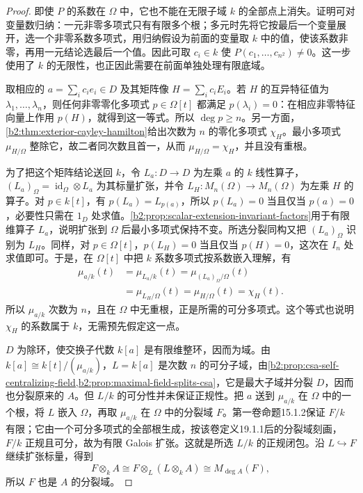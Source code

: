 \begin{proof}
	即使 \(P\) 的系数在 \(\Omega\) 中，它也不能在无限子域 \(k\) 的全部点上消失。证明可对变量数归纳：一元非零多项式只有有限多个根；多元时先将它按最后一个变量展开，选一个非零系数多项式，用归纳假设为前面的变量取 \(k\) 中的值，使该系数非零，再用一元结论选最后一个值。因此可取 \(c_i\in k\) 使 \(P(c_1,\ldots,c_{n^2})\ne0\)。这一步使用了 \(k\) 的无限性，也正因此需要在前面单独处理有限底域。

	取相应的 \(a=\sum_i c_ie_i\in D\) 及其矩阵像 \(H=\sum_i c_iE_i\)。若 \(H\) 的互异特征值为 \(\lambda_1,\ldots,\lambda_n\)，则任何非零零化多项式 \(p\in\Omega[t]\) 都满足 \(p(\lambda_i)=0\)：在相应非零特征向量上作用 \(p(H)\)，就得到这一等式。所以 \(\deg p\ge n\)。另一方面，\cref{b2:thm:exterior-cayley-hamilton}给出次数为 \(n\) 的零化多项式 \(\chi_H\)。最小多项式 \(\mu_{H/\Omega}\) 整除它，故二者同次数且首一，从而 \(\mu_{H/\Omega}=\chi_H\)，并且没有重根。

	为了把这个矩阵结论送回 \(k\)，令 \(L_a:D\rightarrow D\) 为左乘 \(a\) 的 \(k\) 线性算子，\((L_a)_\Omega=\operatorname{id}_\Omega\otimes L_a\) 为其标量扩张，并令 \(L_H:M_n(\Omega)\rightarrow M_n(\Omega)\) 为左乘 \(H\) 的算子。对 \(p\in k[t]\)，有 \(p(L_a)=L_{p(a)}\)，所以 \(p(L_a)=0\) 当且仅当 \(p(a)=0\)，必要性只需在 \(1_D\) 处求值。\cref{b2:prop:scalar-extension-invariant-factors}用于有限维算子 \(L_a\)，说明扩张到 \(\Omega\) 后最小多项式保持不变。所选分裂同构又把 \((L_a)_\Omega\) 识别为 \(L_H\)。同样，对 \(p\in\Omega[t]\)，\(p(L_H)=0\) 当且仅当 \(p(H)=0\)，这次在 \(I_n\) 处求值即可。于是，在 \(\Omega[t]\) 中把 \(k\) 系数多项式按系数嵌入理解，有
	\[
		\begin{aligned}
			\mu_{a/k}(t) &=\mu_{L_a/k}(t)=\mu_{(L_a)_\Omega/\Omega}(t)\\
			&=\mu_{L_H/\Omega}(t)=\mu_{H/\Omega}(t)=\chi_H(t).
		\end{aligned}
	\]
	所以 \(\mu_{a/k}\) 次数为 \(n\)，且在 \(\Omega\) 中无重根，正是所需的可分多项式。这个等式也说明 \(\chi_H\) 的系数属于 \(k\)，无需预先假定这一点。

	\(D\) 为除环，使交换子代数 \(k[a]\) 是有限维整环，因而为域。由 \(k[a]\cong k[t]/(\mu_{a/k})\)，\(L=k[a]\) 是次数 \(n\) 的可分子域，由\cref{b2:prop:csa-self-centralizing-field,b2:prop:maximal-field-splits-csa}，它是最大子域并分裂 \(D\)，因而也分裂原来的 \(A\)。但 \(L/k\) 的可分性并未保证正规性。把 \(a\) 送到 \(\mu_{a/k}\) 在 \(\Omega\) 中的一个根，将 \(L\) 嵌入 \(\Omega\)，再取 \(\mu_{a/k}\) 在 \(\Omega\) 中的分裂域 \(F\)。第一卷命题15.1.2保证 \(F/k\) 有限；它由一个可分多项式的全部根生成，按该卷定义19.1.1后的分裂域刻画，\(F/k\) 正规且可分，故为有限 Galois 扩张。这就是所选 \(L/k\) 的正规闭包。沿 \(L\hookrightarrow F\) 继续扩张标量，得到
	\[
		F\otimes_kA\cong F\otimes_L(L\otimes_kA) \cong M_{\deg A}(F),
	\]
	所以 \(F\) 也是 \(A\) 的分裂域。
\end{proof}

